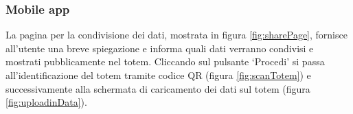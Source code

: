 \subsubsection{Mobile app}
La pagina per la condivisione dei dati, mostrata in figura \ref{fig:sharePage}, fornisce all'utente una breve spiegazione e informa quali dati verranno condivisi e mostrati pubblicamente nel totem.
Cliccando sul pulsante \enquote*{Procedi} si passa all'identificazione del totem tramite codice QR (figura \ref{fig:scanTotem}) e successivamente alla schermata di caricamento dei dati sul totem (figura \ref{fig:uploadinData}).
\begin{figure}[h]
    \centering
\end{figure}
